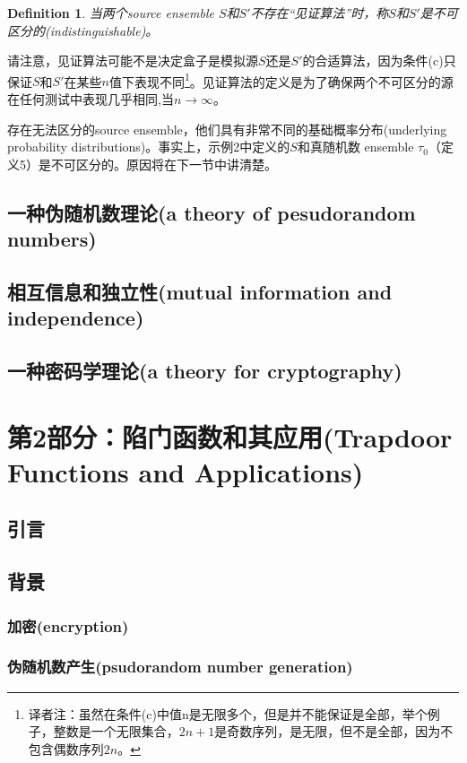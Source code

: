 \documentclass[]{article}
\newtheorem{definition}{Definition}
\begin{document}
\begin{definition}
	当两个source ensemble $S$和$S'$不存在“见证算法”时，称$S$和$S'$是不可区分的(indistinguishable)。
\end{definition}

请注意，见证算法可能不是决定盒子是模拟源$S$还是$S'$的合适算法，因为条件(c)只保证$S$和$S'$在某些$n$值下表现不同\footnote{译者注：虽然在条件(c)中值n是无限多个，但是并不能保证是全部，举个例子，整数是一个无限集合，$2n+1$是奇数序列，是无限，但不是全部，因为不包含偶数序列$2n$。}。见证算法的定义是为了确保两个不可区分的源在任何测试中表现几乎相同,当$n \rightarrow\infty$。


存在无法区分的source ensemble，他们具有非常不同的基础概率分布(underlying probability distributions)。事实上，示例2中定义的$S$和真随机数 ensemble $\tau_0$（定义5）是不可区分的。原因将在下一节中讲清楚。


\subsection{一种伪随机数理论(a theory of pesudorandom numbers)}

\subsection{相互信息和独立性(mutual information and independence)}

\subsection{一种密码学理论(a theory for cryptography)}

\section{第2部分：陷门函数和其应用(Trapdoor Functions and Applications)}
\subsection{引言}

\subsection{背景}
\subsubsection{加密(encryption)}

\subsubsection{伪随机数产生(psudorandom number generation)}
\end{document}
